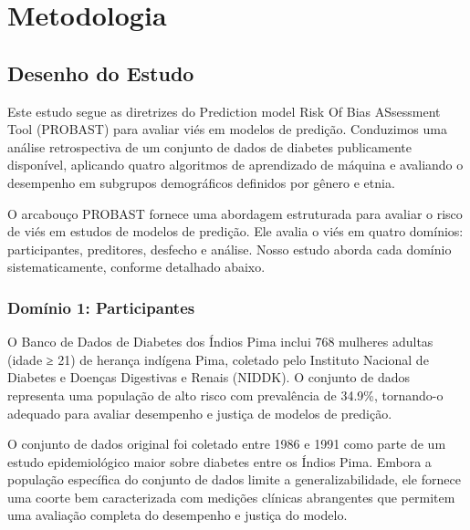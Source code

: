 
\section{Metodologia}

\subsection{Desenho do Estudo}

Este estudo segue as diretrizes do Prediction model Risk Of Bias ASsessment 
Tool (PROBAST) \cite{wolff2019} para avaliar viés em modelos de predição. 
Conduzimos uma análise retrospectiva de um conjunto de dados de diabetes 
publicamente disponível, aplicando quatro algoritmos de aprendizado de 
máquina e avaliando o desempenho em subgrupos demográficos definidos por 
gênero e etnia.

O arcabouço PROBAST fornece uma abordagem estruturada para avaliar o risco 
de viés em estudos de modelos de predição. Ele avalia o viés em quatro 
domínios: participantes, preditores, desfecho e análise. Nosso estudo 
aborda cada domínio sistematicamente, conforme detalhado abaixo.

\subsubsection{Domínio 1: Participantes}

O Banco de Dados de Diabetes dos Índios Pima inclui 768 mulheres adultas 
(idade ≥ 21) de herança indígena Pima, coletado pelo Instituto Nacional 
de Diabetes e Doenças Digestivas e Renais (NIDDK). O conjunto de dados 
representa uma população de alto risco com prevalência de 34.9\%, tornando-o 
adequado para avaliar desempenho e justiça de modelos de predição.

O conjunto de dados original foi coletado entre 1986 e 1991 como parte de 
um estudo epidemiológico maior sobre diabetes entre os Índios Pima. Embora 
a população específica do conjunto de dados limite a generalizabilidade, 
ele fornece uma coorte bem caracterizada com medições clínicas abrangentes 
que permitem uma avaliação completa do desempenho e justiça do modelo.

